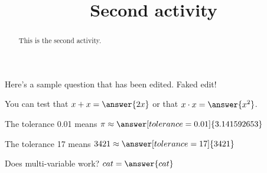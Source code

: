 \documentclass[handout]{ximera}
\title{Second activity}
\begin{document}
\begin{abstract}
This is the second activity.
\end{abstract}


\maketitle

Here's a sample question that has been edited. Faked edit!

\begin{problem}
\begin{multipleChoice}
\end{multipleChoice}
\begin{problem}
   You can test that $x + x = \answer{2x}$ or that $x \cdot x = \answer{x^2}$.

\begin{problem}
   The tolerance 0.01 means $\pi \approx \answer[tolerance=0.01]{3.141592653}$

\begin{problem}
   The tolerance 17 means $3421 \approx \answer[tolerance=17]{3421}$

\begin{problem}
Does multi-variable work? $ cat = \answer{cat}$
\end{problem}
\end{problem}
\end{problem}
\end{problem}
\end{problem}
\end{document}

